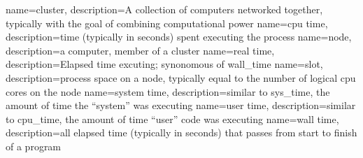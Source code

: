 {
    name=cluster,
    description={A collection of computers networked together, typically with
    the goal of combining computational power}
}
{
    name=\gls{cpu} time,
    description={time (typically in seconds) spent executing the process}
}
{
    name=node,
    description={a computer, member of a \gls{cluster}}
}
{
    name=real time,
    description={Elapsed time excuting; synonomous of \gls{wall_time}}
}
{
    name=slot,
    description={process space on a \gls{node}, typically equal to the number
    of logical \gls{cpu} cores on the node}
}
{
    name=system time,
    description={similar to \gls{sys_time}, the amount of time the ``system''
    was executing}
}
{
    name=user time,
    description={similar to \gls{cpu_time}, the amount of time ``user'' code
    was executing}
}
{
    name=wall time,
    description={all elapsed time (typically in seconds) that passes from start
    to finish of a program}
}
